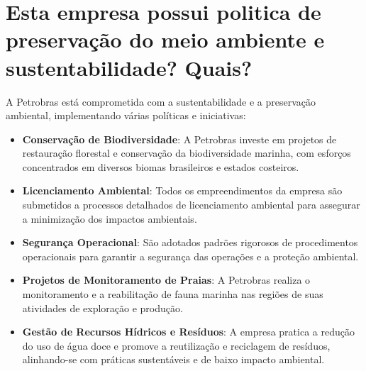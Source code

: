 \section{Esta empresa possui politica de preservação do meio ambiente e sustentabilidade? Quais?}

A Petrobras está comprometida com a sustentabilidade e a preservação ambiental, implementando várias políticas e iniciativas:

\begin{itemize}
    \item \textbf{Conservação de Biodiversidade}: A Petrobras investe em projetos de restauração florestal e conservação da biodiversidade marinha, com esforços concentrados em diversos biomas brasileiros e estados costeiros.
    \item \textbf{Licenciamento Ambiental}: Todos os empreendimentos da empresa são submetidos a processos detalhados de licenciamento ambiental para assegurar a minimização dos impactos ambientais.
    \item \textbf{Segurança Operacional}: São adotados padrões rigorosos de procedimentos operacionais para garantir a segurança das operações e a proteção ambiental.
    \item \textbf{Projetos de Monitoramento de Praias}: A Petrobras realiza o monitoramento e a reabilitação de fauna marinha nas regiões de suas atividades de exploração e produção.
    \item \textbf{Gestão de Recursos Hídricos e Resíduos}: A empresa pratica a redução do uso de água doce e promove a reutilização e reciclagem de resíduos, alinhando-se com práticas sustentáveis e de baixo impacto ambiental.
\end{itemize}

